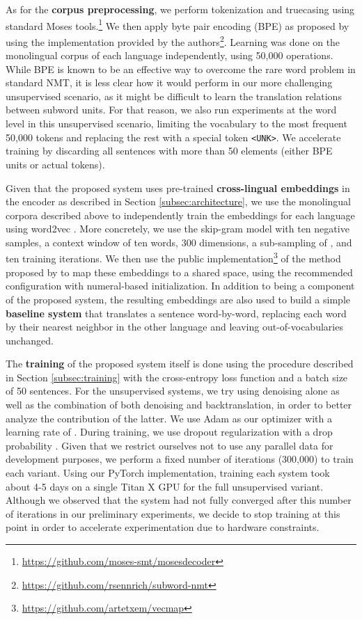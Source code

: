 \documentclass{article} \usepackage{iclr2018_conference,times}
\begin{document}
As for the \textbf{corpus preprocessing}, we perform tokenization and truecasing using standard Moses tools.\footnote{\url{https://github.com/moses-smt/mosesdecoder}} We then apply byte pair encoding (BPE) as proposed by \citet{sennrich2016neural} using the implementation provided by the authors\footnote{\url{https://github.com/rsennrich/subword-nmt}}. Learning was done on the monolingual corpus of each language independently, using 50,000 operations. While BPE is known to be an effective way to overcome the rare word problem in standard NMT, it is less clear how it would perform in our more challenging unsupervised scenario, as it might be difficult to learn the translation relations between subword units. For that reason, we also run experiments at the word level in this unsupervised scenario, limiting the vocabulary to the most frequent 50,000 tokens and replacing the rest with a special token \texttt{<UNK>}. We accelerate training by discarding all sentences with more than 50 elements (either BPE units or actual tokens).

Given that the proposed system uses pre-trained \textbf{cross-lingual embeddings} in the encoder as described in Section \ref{subsec:architecture}, we use the monolingual corpora described above to independently train the embeddings for each language using word2vec \citep{mikolov2013distributed}. More concretely, we use the skip-gram model with ten negative samples, a context window of ten words, 300 dimensions, a sub-sampling of , and ten training iterations. We then use the public implementation\footnote{\url{https://github.com/artetxem/vecmap}} of the method proposed by \citet{artetxe2017learning} to map these embeddings to a shared space, using the recommended configuration with numeral-based initialization. In addition to being a component of the proposed system, the resulting embeddings are also used to build a simple \textbf{baseline system} that translates a sentence word-by-word, replacing each word by their nearest neighbor in the other language and leaving out-of-vocabularies unchanged.

The \textbf{training} of the proposed system itself is done using the procedure described in Section \ref{subsec:training} with the cross-entropy loss function and a batch size of 50 sentences. For the unsupervised systems, we try using denoising alone as well as the combination of both denoising and backtranslation, in order to better analyze the contribution of the latter. We use Adam as our optimizer with a learning rate of  \citep{diederik2015adam}. During training, we use dropout regularization with a drop probability . Given that we restrict ourselves not to use any parallel data for development purposes, we perform a fixed number of iterations (300,000) to train each variant. Using our PyTorch implementation, training each system took about 4-5 days on a single Titan X GPU for the full unsupervised variant. Although we observed that the system had not fully converged after this number of iterations in our preliminary experiments, we decide to stop training at this point in order to accelerate experimentation due to hardware constraints.
\end{document}
